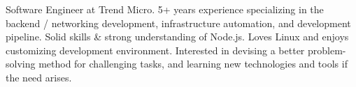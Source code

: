 

\begin{cvparagraph}

Software Engineer at Trend Micro. 5+ years experience specializing in the backend / networking development,
infrastructure automation, and development pipeline. Solid skills \& strong understanding of Node.js. Loves
Linux and enjoys customizing development environment. Interested in devising a better problem-solving
method for challenging tasks, and learning new technologies and tools if the need arises.
\end{cvparagraph}
